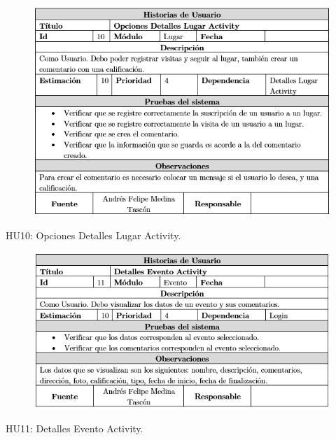\documentclass[12pt,letterpaper,openany]{book}
\begin{document}
\begin{table}[H]
\begin{center}
\begin{figure}[H]
\begin{center}
\includegraphics[width=13cm]{./imagenes/HU/HU10}
\end{center}
\end{figure}
\end{center}
\caption{HU10: Opciones Detalles Lugar Activity.}
\end{table}

\begin{table}[H]
\begin{center}
\begin{figure}[H]
\begin{center}
\includegraphics[width=13cm]{./imagenes/HU/HU11}
\end{center}
\end{figure}
\end{center}
\caption{HU11: Detalles Evento Activity.}
\end{table}
\end{document}
